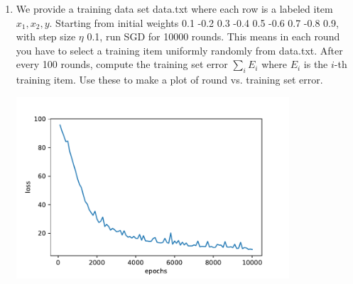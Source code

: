 \documentclass[a4paper]{article}
\theoremstyle{definition}
\newenvironment{soln}{
    \leavevmode\color{blue}\ignorespaces
}{}
\begin{document}
\begin{enumerate}
\begin{verbatim}
(weights) 1 0.9 0.8 0.7 0.6 0.5 0.4 0.3 0.2 (x) -0.2 1.7 (y) 0 (eta) 0.1
1.00000 0.90000 0.80000 0.70000 0.60000 0.50000 0.40000 0.30000 0.20000
0.31402
0.99609 0.90078 0.79335 0.69739 0.60052 0.49557 0.38697 0.27159 0.18136
0.29972

(weights) 4 3 2 1 0 -1 -2 -3 -4 (x) -4 1 (y) 0 (eta) 0.1
4.00000 3.00000 2.00000 1.00000 0.00000 -1.00000 -2.00000 -3.00000 -4.00000
0.00710
4.00000 3.00000 2.00000 1.00501 -0.02002 -0.99499 -2.00125 -3.00000 -4.00000
0.00371
\end{verbatim}
Print these for weights 0.1 -0.2 0.3 -0.4 0.5 -0.6 0.7 -0.8 0.9, input $x$ 1 -1, label $y$ 1, step size $\eta$ 0.1.

\begin{soln}
0.1, -0.2, 0.3, -0.4, 0.5, -0.6, 0.7, -0.8, 0.9\\
0.02187\\
0.1, -0.2, 0.3, -0.39689, 0.50311, -0.60311, 0.70346, -0.8, 0.90242\\
0.02141
\end{soln}

\item
We provide a training data set data.txt where each row is a labeled item $x_1, x_2, y$.
Starting from initial weights 0.1 -0.2 0.3 -0.4 0.5 -0.6 0.7 -0.8 0.9, with step size $\eta$ 0.1,
run SGD for 10000 rounds.  This means in each round you have to select a training item uniformly randomly from data.txt.
After every 100 rounds, compute the training set error $\sum_i E_i$ where $E_i$ is the $i$-th training item.
Use these to make a plot of round vs. training set error.

\begin{soln}
\includegraphics[width=4in]{Q26.pdf}
\end{soln}


\end{enumerate}
\end{document}
